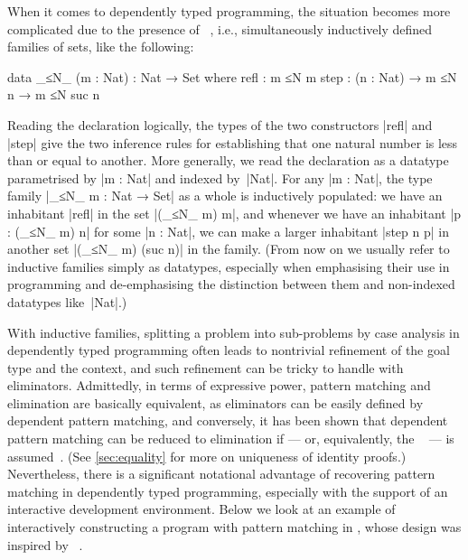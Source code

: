 When it comes to dependently typed programming, the situation becomes more complicated due to the presence of ~\citep{Dybjer-inductive-families}, i.e., simultaneously inductively defined families of sets, like the following:
\begin{code}
data _≤N_ (m : Nat) : Nat → Set where
  refl  : m ≤N m
  step  : (n : Nat) → m ≤N n → m ≤N suc n
\end{code}
Reading the declaration logically, the types of the two constructors |refl| and |step| give the two inference rules for establishing that one natural number is less than or equal to another.
More generally, we read the declaration as a datatype parametrised by |m : Nat|  and indexed by~|Nat|.
For any |m : Nat|, the type family |_≤N_ m : Nat → Set| as a whole is inductively populated: we have an inhabitant |refl| in the set |(_≤N_ m) m|, and whenever we have an inhabitant |p : (_≤N_ m) n| for some |n : Nat|, we can make a larger inhabitant |step n p| in another set |(_≤N_ m) (suc n)| in the family.
(From now on we usually refer to inductive families simply as datatypes, especially when emphasising their use in programming and de-emphasising the distinction between them and non-indexed datatypes like~|Nat|.)

With inductive families, splitting a problem into sub-problems by case analysis in dependently typed programming often leads to nontrivial refinement of the goal type and the context, and such refinement can be tricky to handle with eliminators.
Admittedly, in terms of expressive power, pattern matching and elimination are basically equivalent, as eliminators can be easily defined by dependent pattern matching, and conversely, it has been shown that dependent pattern matching can be reduced to elimination if  --- or, equivalently, the ~\citep{Streicher-ITT} --- is assumed~\citep{McBride-thesis, Goguen-elim}.
(See \autoref{sec:equality} for more on uniqueness of identity proofs.)
Nevertheless, there is a significant notational advantage of recovering pattern matching in dependently typed programming, especially with the support of an interactive development environment.
Below we look at an example of interactively constructing a program with pattern matching in \Agda, whose design was inspired by ~\citep{McBride-Epigram, McBride-view}.

